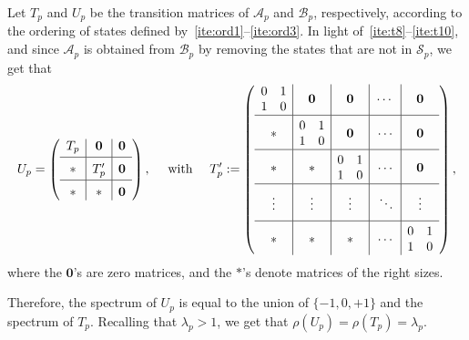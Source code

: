 \documentclass[11pt]{article}
\theoremstyle{remark}\newtheorem{remark}[theorem]{Remark}
\begin{document}
Let $T_p$ and $U_p$ be the transition matrices of $\mathcal{A}_p$ and $\mathcal{B}_p$, respectively, according to the ordering of states defined by~\ref{ite:ord1}--\ref{ite:ord3}.
In light of~\ref{ite:t8}--\ref{ite:t10}, and since $\mathcal{A}_p$ is obtained from $\mathcal{B}_p$ by removing the states that are not in $\mathcal{S}_p$, we get that
\begin{equation*}
	U_p = \begin{pmatrix}\begin{array}{c|c|c}
			T_p & \mathbf{0} & \mathbf{0} \\[2pt] \hline
			\rule{0pt}{\normalbaselineskip} * & T_p^\prime & \mathbf{0} \\[2pt] \hline
			\rule{0pt}{\normalbaselineskip} * & * & \mathbf{0}
	\end{array}\end{pmatrix}, \quad\text{ with }\quad
	T_p^\prime := \begin{pmatrix}\begin{array}{c|c|c|c|c}
			\begin{matrix} 0 & 1 \\ 1 & 0 \end{matrix} & \mathbf{0} & \mathbf{0} & \cdots & \mathbf{0} \\ \hline
			\rule{0pt}{1.7em} * & \begin{matrix} 0 & 1 \\ 1 & 0 \end{matrix} & \mathbf{0} & \,\cdots & \mathbf{0} \\ \hline
			\rule{0pt}{1.7em} * & * & \begin{matrix} 0 & 1 \\ 1 & 0 \end{matrix} & \,\cdots & \mathbf{0} \\ \hline
			\rule{0pt}{2em} \vdots & \vdots & \vdots & \,\ddots & \vdots \\[5pt] \hline
			\rule{0pt}{1.7em} * & * & * & \,\cdots & \begin{matrix} 0 & 1 \\ 1 & 0 \end{matrix}
	\end{array}\end{pmatrix} ,
\end{equation*}
where the $\mathbf{0}$'s are zero matrices, and the $\mathbf{*}$'s denote matrices of the right sizes.

Therefore, the spectrum of $U_p$ is equal to the union of $\{-1, 0, +1\}$ and the spectrum of $T_p$.
Recalling that $\lambda_p > 1$, we get that $\rho(U_p) = \rho(T_p) = \lambda_p$.
\end{document}
